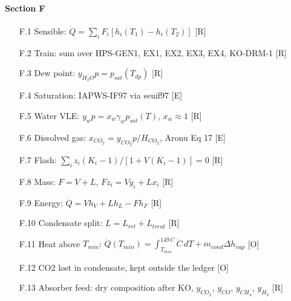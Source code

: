 \paragraph{Section F}
\begin{enumerate}[leftmargin=1.4cm,itemsep=0pt,topsep=2pt,parsep=0pt]\small
\item[F.1] Sensible: $\dot Q=\sum_iF_i[h_i(T_1)-h_i(T_2)]$ {\footnotesize [R]}
\item[F.2] Train: sum over HPS-GEN1, EX1, EX2, EX3, EX4, KO-DRM-1 {\footnotesize [R]}
\item[F.3] Dew point: $y_{H_2O}p=p_{sat}(T_{dp})$ {\footnotesize [R]}
\item[F.4] Saturation: IAPWS-IF97 via seuif97 {\footnotesize [E]}
\item[F.5] Water VLE: $y_wp=x_w\gamma_wp_{sat}(T)$, $x_w\approx1$ {\footnotesize [R]}
\item[F.6] Dissolved gas: $x_{CO_2}=y_{CO_2}p/H_{CO_2}$, Aronu Eq 17 {\footnotesize [E]}
\item[F.7] Flash: $\sum_iz_i(K_i-1)/[1+V(K_i-1)]=0$ {\footnotesize [R]}
\item[F.8] Mass: $F=V+L$, $Fz_i=Vy_i+Lx_i$ {\footnotesize [R]}
\item[F.9] Energy: $\dot Q=Vh_V+Lh_L-Fh_F$ {\footnotesize [R]}
\item[F.10] Condensate split: $L=L_{ret}+L_{treat}$ {\footnotesize [R]}
\item[F.11] Heat above $T_{min}$: $\dot Q(T_{min})=\int_{T_{min}}^{149\,C}\dot C\,dT+\dot m_{cond}\Delta h_{vap}$ {\footnotesize [O]}
\item[F.12] CO2 lost in condensate, kept outside the ledger {\footnotesize [O]}
\item[F.13] Absorber feed: dry composition after KO, $y_{CO_2}$, $y_{CO}$, $y_{CH_4}$, $y_{H_2}$ {\footnotesize [R]}
\end{enumerate}

